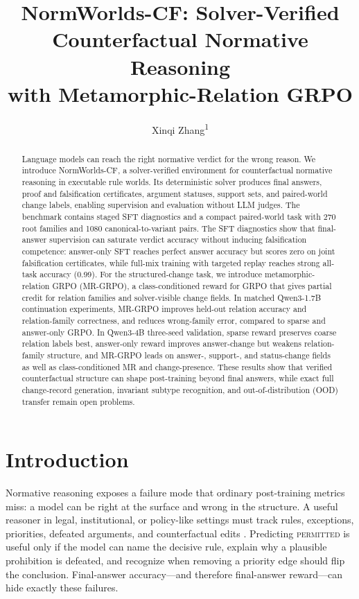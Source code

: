 \documentclass[letterpaper]{article}
\title{NormWorlds-CF: Solver-Verified Counterfactual Normative Reasoning\\with Metamorphic-Relation GRPO}
\author{
    Xinqi Zhang\textsuperscript{\rm 1}
}
\newcommand{\method}{MR-GRPO}
\newcommand{\dataset}{NormWorlds-CF}
\newcommand{\lab}[1]{\textsc{#1}}
\begin{document}
\maketitle

\begin{abstract}
Language models can reach the right normative verdict for the wrong reason. We introduce \dataset, a solver-verified environment for counterfactual normative reasoning in executable rule worlds. Its deterministic solver produces final answers, proof and falsification certificates, argument statuses, support sets, and paired-world change labels, enabling supervision and evaluation without LLM judges. The benchmark contains staged SFT diagnostics and a compact paired-world task with 270 root families and 1080 canonical-to-variant pairs. The SFT diagnostics show that final-answer supervision can saturate verdict accuracy without inducing falsification competence: answer-only SFT reaches perfect answer accuracy but scores zero on joint falsification certificates, while full-mix training with targeted replay reaches strong all-task accuracy (0.99). For the structured-change task, we introduce metamorphic-relation GRPO (\method), a class-conditioned reward for GRPO that gives partial credit for relation families and solver-visible change fields. In matched Qwen3-1.7B continuation experiments, \method{} improves held-out relation accuracy and relation-family correctness, and reduces wrong-family error, compared to sparse and answer-only GRPO. In Qwen3-4B three-seed validation, sparse reward preserves coarse relation labels best, answer-only reward improves answer-change but weakens relation-family structure, and \method{} leads on answer-, support-, and status-change fields as well as class-conditioned MR and change-presence. These results show that verified counterfactual structure can shape post-training beyond final answers, while exact full change-record generation, invariant subtype recognition, and out-of-distribution (OOD) transfer remain open problems.
\end{abstract}

\section{Introduction}

Normative reasoning exposes a failure mode that ordinary post-training metrics miss: a model can be right at the surface and wrong in the structure. A useful reasoner in legal, institutional, or policy-like settings must track rules, exceptions, priorities, defeated arguments, and counterfactual edits \cite{vonwright1951deontic,nute1994defeasible,prakken2015law,guha2023legalbench}. Predicting \lab{permitted} is useful only if the model can name the decisive rule, explain why a plausible prohibition is defeated, and recognize when removing a priority edge should flip the conclusion. Final-answer accuracy---and therefore final-answer reward---can hide exactly these failures.
\end{document}
